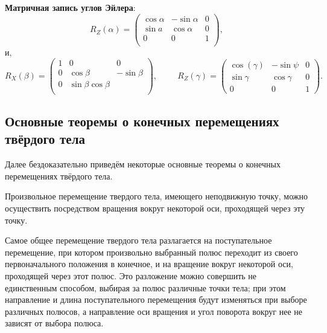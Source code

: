 \phantom{42}

\noindent
\textbf{Матричная запись углов Эйлера}:
\begin{equation*}
    R_Z(\alpha) = \begin{pmatrix}
        \cos \alpha & - \sin \alpha & 0 \\
        \sin    a & \cos\alpha & 0 \\
        0 & 0 & 1\\
    \end{pmatrix},
\end{equation*}
и,
\begin{equation}
    R_X(\beta) = \begin{pmatrix}
        1 & 0 & 0 \\
        0 & \cos \beta & -\sin \beta \\
        0 & \sin \beta \cos \beta \\
    \end{pmatrix},
    \hspace{1cm} 
    R_Z (\gamma) = \begin{pmatrix}
        \cos(\gamma) & - \sin \psi & 0 \\
        \sin \gamma & \cos \gamma & 0\\
        0 & 0 & 1
    \end{pmatrix}.
\end{equation}

\subsection{Основные теоремы о конечных перемещениях твёрдого тела}


Далее бездоказательно приведём некоторые основные теоремы о конечных перемещениях твёрдого тела.

\begin{to_thr}
     Произвольное перемещение твердого тела, имеющего неподвижную точку, можно осуществить посредством вращения вокруг некоторой оси, проходящей через эту точку. 
\end{to_thr}

\begin{to_thr}
     Самое общее перемещение твердого тела разлагается на поступательное перемещение, при котором произвольно выбранный полюс переходит из своего первоначального положения в конечное, и на вращение вокруг некоторой оси, проходящей через этот полюс. Это разложение можно совершить не единственным способом, выбирая за полюс различные точки тела; при этом направление и длина поступательного перемещения будут изменяться при выборе различных 
полюсов, а направление оси вращения и угол поворота вокруг нее не зависят от выбора полюса. 
\end{to_thr}

